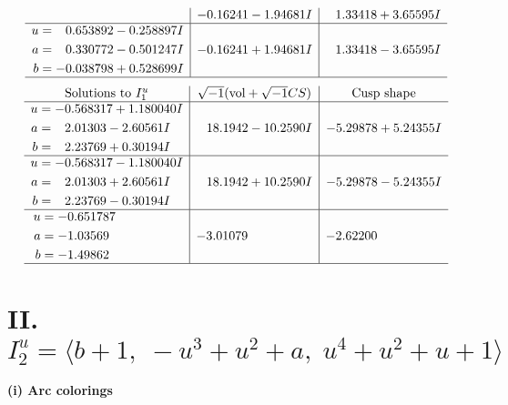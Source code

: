 \documentclass[1p]{elsarticle_modified}
\theoremstyle{definition}
\newcommand{\I}{\sqrt{-1}}
\begin{document}
$$\begin{array}{c|c|c}
 & -0.16241 - 1.94681 I & \phantom{-}1.33418 + 3.65595 I \\ \hline\begin{aligned}
u &= \phantom{-}0.653892 - 0.258897 I \\
a &= \phantom{-}0.330772 - 0.501247 I \\
b &= -0.038798 + 0.528699 I\end{aligned}
 & -0.16241 + 1.94681 I & \phantom{-}1.33418 - 3.65595 I\\
 \hline 
 \end{array}$$\newpage$$\begin{array}{c|c|c}  
\text{Solutions to }I^u_{1}& \I (\text{vol} + \sqrt{-1}CS) & \text{Cusp shape}\\
 \hline 
\begin{aligned}
u &= -0.568317 + 1.180040 I \\
a &= \phantom{-}2.01303 - 2.60561 I \\
b &= \phantom{-}2.23769 + 0.30194 I\end{aligned}
 & \phantom{-}18.1942 - 10.2590 I & -5.29878 + 5.24355 I \\ \hline\begin{aligned}
u &= -0.568317 - 1.180040 I \\
a &= \phantom{-}2.01303 + 2.60561 I \\
b &= \phantom{-}2.23769 - 0.30194 I\end{aligned}
 & \phantom{-}18.1942 + 10.2590 I & -5.29878 - 5.24355 I \\ \hline\begin{aligned}
u &= -0.651787\phantom{ +0.000000I} \\
a &= -1.03569\phantom{ +0.000000I} \\
b &= -1.49862\phantom{ +0.000000I}\end{aligned}
 & -3.01079\phantom{ +0.000000I} & -2.62200\phantom{ +0.000000I}\\
 \hline 
 \end{array}$$\newpage\newpage\renewcommand{\arraystretch}{1}
\centering \section*{II. $I^u_{2}= \langle b+1,\;- u^3+u^2+a,\;u^4+u^2+u+1 \rangle$}
\flushleft \textbf{(i) Arc colorings}\\
\end{document}
